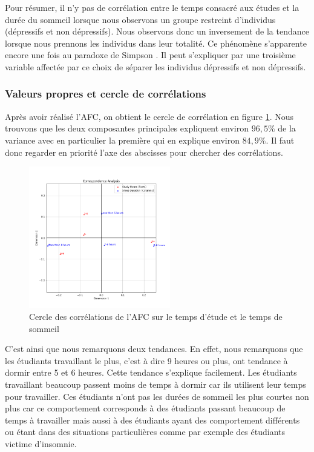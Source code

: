 Pour résumer, il n'y pas de corrélation entre le temps consacré aux études et la durée du sommeil lorsque nous observons un groupe restreint d'individus (dépressifs et non dépressifs).
Nous observons donc un inversement de la tendance lorsque nous prennons les individus dans leur totalité.
Ce phénomène s'apparente encore une fois au paradoxe de Simpson \citep{simpson}. Il peut s'expliquer par une troisième variable affectée par ce choix de séparer les individus dépressifs et non dépressifs.

\subsubsection{Valeurs propres et cercle de corrélations}
 
Après avoir réalisé l'AFC, on obtient le cercle de corrélation en figure \ref{fig:corrStudySleep}. 
Nous trouvons que les deux composantes principales expliquent environ $96,5\%$ de la variance avec en particulier la première qui en explique environ $84,9\%$.
Il faut donc regarder en priorité l'axe des abscisses pour chercher des corrélations.


\begin{figure}[H]
    \begin{center}
      \includegraphics[width=0.55\textwidth,height=0.325\textheight,keepaspectratio]{Images/Study_Sleep_all/Corr_circle.png}
    \end{center}
    \caption{Cercle des corrélations de l'AFC sur le temps d'étude et le temps de sommeil}
    \label{fig:corrStudySleep}
\end{figure}

C'est ainsi que nous remarquons deux tendances. 
En effet, nous remarquons que les étudiants travaillant le plus, c'est à dire 9 heures ou plus, ont tendance à dormir entre 5 et 6 heures. 
Cette tendance s'explique facilement. 
Les étudiants travaillant beaucoup passent moins de temps à dormir car ils utilisent leur temps pour travailler.
Ces étudiants n'ont pas les durées de sommeil les plus courtes non plus car ce comportement corresponds à des étudiants passant beaucoup de temps à travailler mais aussi à des étudiants ayant des comportement différents ou étant dans des situations particulières comme par exemple des étudiants victime d'insomnie.

